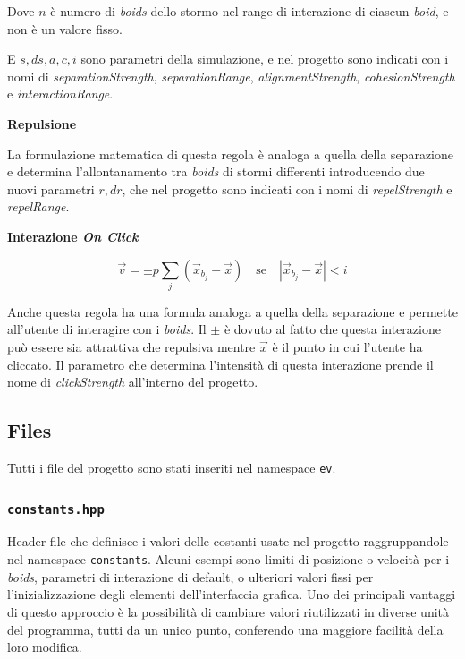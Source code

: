 \documentclass[10pt,a4paper]{article}
\begin{document}
Dove $n$ è numero di \textit{boids} dello stormo nel range di interazione di ciascun \textit{boid}, e non è un valore fisso.

E $s, ds, a, c, i$ sono parametri della simulazione, e nel progetto sono indicati con i nomi di \textit{separationStrength}, \textit{separationRange}, \textit{alignmentStrength}, \textit{cohesionStrength} e \textit{interactionRange}.

\vspace{2mm}

\textbf{Repulsione}

La formulazione matematica di questa regola è analoga a quella della separazione e determina l'allontanamento tra \textit{boids} di stormi differenti introducendo due nuovi parametri $r, dr$, che nel progetto sono indicati con i nomi di \textit{repelStrength} e \textit{repelRange}.

\vspace{2mm}

\textbf{Interazione \textit{On Click}}

\begin{equation*}
    \vec{v} = \pm p \sum_{j} (\vec{x}_{b_j} - \vec{x}) \quad \text{se} \quad \left| \vec{x}_{b_j} - \vec{x} \right| < i
\end{equation*}

Anche questa regola ha una formula analoga a quella della separazione e permette all'utente di interagire con i \textit{boids}. Il $\pm$ è dovuto al fatto che questa interazione può essere sia attrattiva che repulsiva mentre $\vec{x}$ è il punto in cui l'utente ha cliccato. Il parametro che determina l'intensità di questa interazione prende il nome di \textit{clickStrength} all'interno del progetto.

\newpage

\subsection{Files}

Tutti i file del progetto sono stati inseriti nel namespace \texttt{ev}.

\subsubsection{\texttt{constants.hpp}}

Header file che definisce i valori delle costanti usate nel progetto raggruppandole nel namespace \texttt{constants}. Alcuni esempi sono limiti di posizione o velocità per i \textit{boids}, parametri di interazione di default, o ulteriori valori fissi per l'inizializzazione degli elementi dell'interfaccia grafica. Uno dei principali vantaggi di questo approccio è la possibilità di cambiare valori riutilizzati in diverse unità del programma, tutti da un unico punto, conferendo una maggiore facilità della loro modifica.
\end{document}
